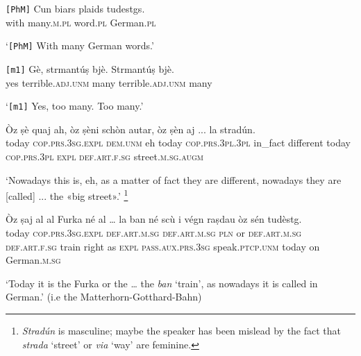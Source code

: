 \begin{linenumbers}
\gll    \texttt{[PhM]} Cun biars plaids tudestgs.\\
\text{}	 with  many.\textsc{m.pl} word.\textsc{pl} German.\textsc{pl} \\
\end{linenumbers}
\medskip
\glt `\texttt{[PhM]} With many German words.'
\medskip

\begin{linenumbers}
\gll   \texttt{[m1]} Gè, strmantúṣ bjè. Strmantúṣ bjè.\\
\textsc{}	yes terrible.\textsc{adj.unm} many terrible.\textsc{adj.unm} many\\
\end{linenumbers}
\medskip
\glt `\texttt{[m1]} Yes, too many. Too many.'
\medskip 

\begin{linenumbers}
\gll    Òz ṣè quaj ah, òz ṣèni schòn autar, òz ṣèn aj ... la stradún. \\
today \textsc{cop.prs.3sg.expl} \textsc{dem.unm} eh today \textsc{cop.prs.3pl.3pl} in\_fact different today \textsc{cop.prs.3pl} \textsc{expl} \textsc{} \textsc{def.art.f.sg} street.\textsc{m.sg.augm} \\
\end{linenumbers}
\medskip
\glt `Nowadays this is, eh, as a matter of fact they are different, nowadays they are [called] ... the «big street».' \footnote{\textit{Stradún} is masculine; maybe the speaker has been mislead by the fact that \textit{strada} `street' or \textit{via} `way' are feminine.}
\medskip

\begin{linenumbers}
\gll    Òz ṣaj al al Furka né al … la ban\footnotemark{} né scù i végn raṣdau òz sén tudèstg.\\
today \textsc{cop.prs.3sg.expl} \textsc{def.art.m.sg} \textsc{def.art.m.sg} \textsc{pln} or \textsc{def.art.m.sg} {} \textsc{def.art.f.sg} train right as \textsc{expl} \textsc{pass.aux.prs.3sg} speak.\textsc{ptcp.unm} today on German.\textsc{m.sg}\\
\end{linenumbers}
\medskip
\glt `Today it is the Furka or the … the \textit{ban} `train', as nowadays it is called in German.' (i.e the Matterhorn-Gotthard-Bahn)
\medskip

